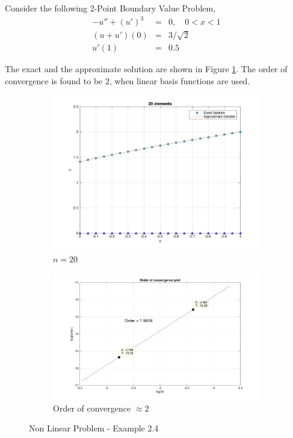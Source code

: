 \begin{example}
	Consider the following 2-Point Boundary Value Problem,
	\begin{eqnarray}
	-u'' + (u')^3 &=& 0, \quad 0<x<1\\
	(u+u')(0) &=& 3/\sqrt{2}\\
	u'(1) &=& 0.5
	\end{eqnarray}
	
	The exact and the approximate solution are shown in Figure \ref{fig6}. The order of convergence is found to be $2$, when linear basis functions are used.
	\begin{figure}[h]
		\begin{subfigure}{0.5\textwidth}
			\includegraphics[scale = 0.2]{images/ex4/nonlinear.jpg}
			\caption{$n=20$}
		\end{subfigure}	
	\begin{subfigure}{0.5\textwidth}
		\includegraphics[scale = 0.2]{images/ex4/non_order.jpg}
		\caption{Order of convergence $\approx 2$}
	\end{subfigure}
	\caption{Non Linear Problem - Example 2.4}	
	\label{fig6}
	\end{figure}
\end{example}
